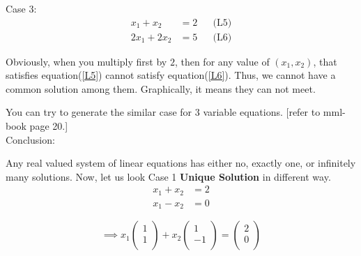 \documentclass{article}
\begin{document}

Case 3:\\

\begin{align}
    x_1 + x_2 &= 2 &&  \text{(L5)}\label{L5}\\
    2x_1 + 2x_2 &= 5  &&  \text{(L6)}\label{L6}
\end{align}

Obviously, when you multiply first by $2$, then for any value of \((x_1, x_2)\), that satisfies equation(\ref{L5}) cannot satisfy equation(\ref{L6}). Thus, we cannot have a common solution among them. Graphically, it means they can not meet.\\


You can try to generate the similar case for 3 variable equations. [refer to mml-book page 20.]\\

Conclusion:\par
Any real valued system of linear equations has either no, exactly one, or infinitely many solutions. Now, let us look Case 1 \textbf{Unique Solution} in different way.\\
\begin{align}
    x_1 + x_2 &= 2 \nonumber\\
    x_1 - x_2 &= 0 \nonumber
\end{align}

\[
\implies x_1 \begin{pmatrix}
                1\\
                1\\
             \end{pmatrix} + x_2 \begin{pmatrix}
                1\\
                -1\\
            \end{pmatrix} = \begin{pmatrix}
                2\\
                0\\
            \end{pmatrix}
\]
\end{document}
